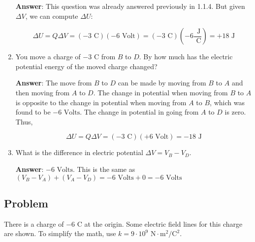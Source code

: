 \documentclass{article}
\begin{document}
\begin{enumerate}
        \ifsolutions
          \textbf{Answer}: This question was already answered previously in 1.1.4. But given $\Delta V$, we can compute $\Delta U$:
        
          \begin{equation}
         \Delta U = Q\Delta V=(-3\text{ C})(-6\text{ Volt})=(-3\text{ C})\left(-6\frac{\text{ J}}{ \text{ C}}\right)=+18\text{ J}
        \end{equation}
        \else
          \vskip 48pt
        \fi

  \item You move a charge of $-3\text{ C}$ from $B$ to $D$. By how much has the electric potential energy of the moved charge changed?

        \ifsolutions
          \textbf{Answer}: The move from $B$ to $D$ can be made by moving from $B$ to $A$ and then moving from $A$ to $D$. The change in potential when moving from $B$ to $A$ is opposite to the change in potential when moving from $A$ to $B$, which was found to be $-6\text{ Volts}$. The change in potential in going from $A$ to $D$ is zero. Thus,
        
          \begin{equation}
         \Delta U = Q\Delta V=(-3\text{ C})(+6\text{ Volt})=-18\text{ J}
        \end{equation}
        \else
          \vskip 48pt
        \fi

  \item What is the difference in electric potential $\Delta V = V_B-V_D$.

        \ifsolutions
          \textbf{Answer}: $-6\text{ Volts}$. This is the same as $(V_B - V_A) + (V_A - V_D) = -6\text{ Volts} + 0 = -6\text{ Volts}$
        \else
          \vskip 48pt
        \fi

\end{enumerate}

\newpage

\subsection{Problem}

There is a charge of $-6\text{ C}$ at the origin. Some electric field lines for this charge are shown. To simplify the math, use $k=9\cdot 10^9\text{ N}\cdot\text{m}^2/\text{C}^2$.


\end{document}
